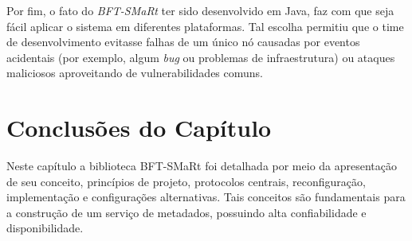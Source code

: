 	 	Por fim, o fato do \textit{BFT-SMaRt} ter sido desenvolvido em Java, faz com que seja fácil aplicar o sistema em diferentes plataformas. Tal escolha permitiu que o time de desenvolvimento evitasse falhas de um único nó causadas por eventos acidentais (por exemplo, algum \textit{bug} ou problemas de infraestrutura) ou ataques maliciosos aproveitando de vulnerabilidades comuns.  \\
	   
	
		
		\section{Conclusões do Capítulo}
		Neste capítulo a biblioteca BFT-SMaRt foi detalhada por meio da apresentação de seu conceito, princípios de projeto, protocolos centrais, reconfiguração, implementação e configurações alternativas. Tais conceitos são fundamentais para a construção de um serviço de metadados, possuindo alta confiabilidade e disponibilidade. 
	